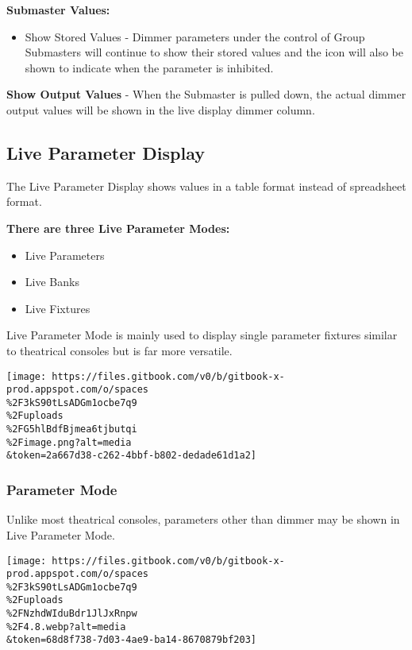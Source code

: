 \documentclass[
]{article}
\providecommand{\tightlist}{%
  \setlength{\itemsep}{0pt}\setlength{\parskip}{0pt}}
\begin{document}
\textbf{Submaster Values:}

\begin{itemize}
\tightlist
\item
  Show Stored Values - Dimmer parameters under the control of Group Submasters will continue to show their stored values and the \href{image.png}{} icon will also be shown to indicate when the parameter is inhibited.
\end{itemize}

\textbf{Show Output Values} - When the Submaster is pulled down, the actual dimmer output values will be shown in the live display dimmer column.

\hypertarget{live-parameter-display}{%
\subsection{Live Parameter Display}\label{live-parameter-display}}

The Live Parameter Display shows values in a table format instead of spreadsheet format.

\textbf{There are three Live Parameter Modes:}

\begin{itemize}
\item
  Live Parameters
\item
  Live Banks
\item
  Live Fixtures
\end{itemize}

Live Parameter Mode is mainly used to display single parameter fixtures similar to theatrical consoles but is far more versatile.

\texttt{[image: https://files.gitbook.com/v0/b/gitbook-x-prod.appspot.com/o/spaces\\\%2F3kS90tLsADGm1ocbe7q9\\\%2Fuploads\\\%2FG5hlBdfBjmea6tjbutqi\\\%2Fimage.png?alt=media\\\&token=2a667d38-c262-4bbf-b802-dedade61d1a2]}

\hypertarget{parameter-mode}{%
\subsubsection{Parameter Mode}\label{parameter-mode}}

Unlike most theatrical consoles, parameters other than dimmer may be shown in Live Parameter Mode.

\texttt{[image: https://files.gitbook.com/v0/b/gitbook-x-prod.appspot.com/o/spaces\\\%2F3kS90tLsADGm1ocbe7q9\\\%2Fuploads\\\%2FNzhdWIduBdr1JlJxRnpw\\\%2F4.8.webp?alt=media\\\&token=68d8f738-7d03-4ae9-ba14-8670879bf203]}
\end{document}
